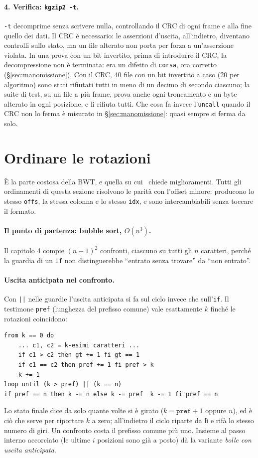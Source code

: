 \documentclass[11pt,a4paper]{article}
\newcommand{\kw}[1]{\texttt{#1}}
\begin{document}
\paragraph{4. Verifica: \texttt{kgzip2 -t}.} \kw{-t} decomprime senza scrivere nulla, controllando il CRC di ogni frame e alla fine quello dei dati. Il CRC è necessario: le asserzioni d'uscita, all'indietro, diventano controlli sullo stato, ma un file alterato non porta per forza a un'asserzione violata. In una prova con un bit invertito, prima di introdurre il CRC, la decompressione non è terminata: era un difetto di \kw{corsa}, ora corretto (§\ref{sec:manomissione}). Con il CRC, 40 file con un bit invertito a caso (20 per algoritmo) sono stati rifiutati tutti in meno di un decimo di secondo ciascuno; la suite di test, su un file a più frame, prova anche ogni troncamento e un byte alterato in ogni posizione, e li rifiuta tutti. Che cosa fa invece l'\kw{uncall} quando il CRC non lo ferma è misurato in §\ref{sec:manomissione}: quasi sempre si ferma da solo.

\section{Ordinare le rotazioni}
\label{sec:ordinare}

È la parte costosa della BWT, e quella su cui~\cite{lyngby} chiede miglioramenti. Tutti gli ordinamenti di questa sezione risolvono le parità con l'offset minore: producono lo stesso \kw{offs}, la stessa colonna e lo stesso \kw{idx}, e sono intercambiabili senza toccare il formato.

\paragraph{Il punto di partenza: bubble sort, $O(n^3)$.} Il capitolo 4 compie $(n-1)^2$ confronti, ciascuno su tutti gli $n$ caratteri, perché la guardia di un \kw{if} non distinguerebbe ``entrato senza trovare'' da ``non entrato''.

\paragraph{Uscita anticipata nel confronto.} Con \kw{||} nelle guardie l'uscita anticipata si fa sul ciclo invece che sull'\kw{if}. Il testimone \kw{pref} (lunghezza del prefisso comune) vale esattamente $k$ finché le rotazioni coincidono:
\begin{lstlisting}
from k == 0 do
    ... c1, c2 = k-esimi caratteri ...
    if c1 > c2 then gt += 1 fi gt == 1
    if c1 == c2 then pref += 1 fi pref > k
    k += 1
loop until (k > pref) || (k == n)
if pref == n then k -= n else k -= pref  k -= 1 fi pref == n
\end{lstlisting}
Lo stato finale dice da solo quante volte si è girato ($k = \kw{pref}+1$ oppure $n$), ed è ciò che serve per riportare $k$ a zero; all'indietro il ciclo riparte da lì e rifà lo stesso numero di giri. Un confronto costa il prefisso comune più uno. Insieme al passo interno accorciato (le ultime $i$ posizioni sono già a posto) dà la variante \emph{bolle con uscita anticipata}.
\end{document}
